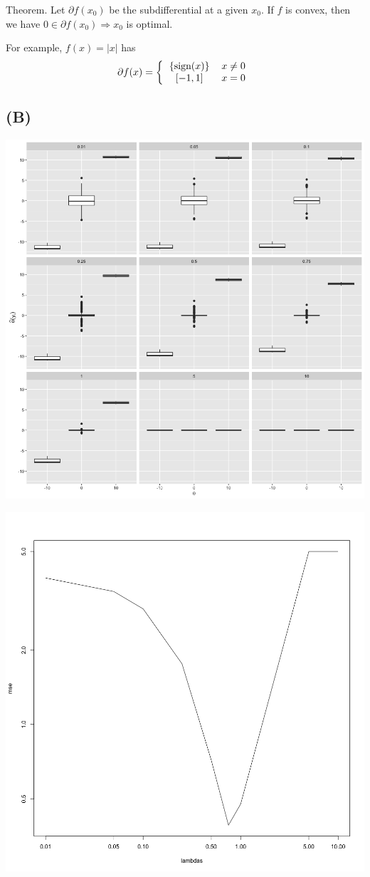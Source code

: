 \documentclass{article}
\begin{document}
Theorem. Let $\partial f(x_0)$ be the subdifferential at a given $x_0$. If $f$ is convex, then we have
$0\in\partial f(x_0) \Rightarrow x_0$ is optimal.

For example, $f(x)=|x|$ has \begin{align*}\partial f(x)=\left\{
\begin{tabular}{cc}
$\{ \textrm{sign}(x) \}$ & $x\neq 0$\\
$[-1, 1]$ & $x = 0$
\end{tabular}\right.\end{align*}

\subsection{(B)}
\includegraphics[scale=0.5]{sparsity.png}

\includegraphics[scale=0.5]{mse_lambdas.png}
\end{document}

